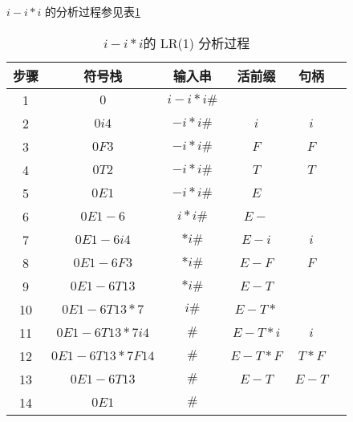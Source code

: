 \documentclass[UTF8]{ctexart}
\begin{document}
        $i-i*i$ 的分析过程参见表\ref{sop}
        \begin{table}[htbp!]
            \centering
            \begin{tabular}{|c|c|c|c|c|c|}
                \hline
                步骤 & 符号栈 & 输入串 & 活前缀 & 句柄 \\
                \hline
                1 & $0$ & $i-i*i\#$ &  &   \\
                \hline
                2 & $0i4$ & $-i*i\#$ & $i$ & $i$  \\
                \hline
                3 & $0F3$ & $-i*i\#$ & $F$ & $F$  \\
                \hline
                4 & $0T2$ & $-i*i\#$ & $T$ & $T$  \\
                \hline
                5 & $0E1$ & $-i*i\#$ & $E$ &  \\
                \hline
                6 & $0E1-6$ & $i*i\#$ & $E-$ &  \\
                \hline
                7 & $0E1-6i4$ & $*i\#$ & $E-i$ & $i$ \\
                \hline
                8 & $0E1-6F3$ & $*i\#$ & $E-F$ & $F$ \\
                \hline
                9 & $0E1-6T13$ & $*i\#$ & $E-T$ & \\
                \hline
                10 & $0E1-6T13*7$ & $i\#$ & $E-T*$ & \\
                \hline
                11 & $0E1-6T13*7i4$ & $\#$ & $E-T*i$ & $i$ \\
                \hline
                12 & $0E1-6T13*7F14$ & $\#$ & $E-T*F$ & $T*F$ \\
                \hline
                13 & $0E1-6T13$ & $\#$ & $E-T$ & $E-T$ \\
                \hline
                14 & $0E1$ & $\#$ & & \\
                \hline
            \end{tabular}
            \caption{$i-i*i$的 LR(1) 分析过程}
            \label{sop}
        \end{table}
\end{document}
